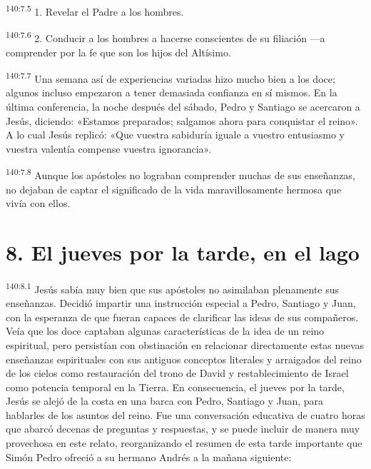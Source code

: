 \par 
\textsuperscript{140:7.5} 1. Revelar el Padre a los hombres.

\par 
\textsuperscript{140:7.6} 2. Conducir a los hombres a hacerse conscientes de su filiación ---a comprender por la fe que son los hijos del Altísimo.

\par 
\textsuperscript{140:7.7} Una semana así de experiencias variadas hizo mucho bien a los doce; algunos incluso empezaron a tener demasiada confianza en sí mismos. En la última conferencia, la noche después del sábado, Pedro y Santiago se acercaron a Jesús, diciendo: «Estamos preparados; salgamos ahora para conquistar el reino». A lo cual Jesús replicó: «Que vuestra sabiduría iguale a vuestro entusiasmo y vuestra valentía compense vuestra ignorancia».

\par 
\textsuperscript{140:7.8} Aunque los apóstoles no lograban comprender muchas de sus enseñanzas, no dejaban de captar el significado de la vida maravillosamente hermosa que vivía con ellos.

\section*{8. El jueves por la tarde, en el lago}
\par 
\textsuperscript{140:8.1} Jesús sabía muy bien que sus apóstoles no asimilaban plenamente sus enseñanzas. Decidió impartir una instrucción especial a Pedro, Santiago y Juan, con la esperanza de que fueran capaces de clarificar las ideas de sus compañeros. Veía que los doce captaban algunas características de la idea de un reino espiritual, pero persistían con obstinación en relacionar directamente estas nuevas enseñanzas espirituales con sus antiguos conceptos literales y arraigados del reino de los cielos como restauración del trono de David y restablecimiento de Israel como potencia temporal en la Tierra. En consecuencia, el jueves por la tarde, Jesús se alejó de la costa en una barca con Pedro, Santiago y Juan, para hablarles de los asuntos del reino. Fue una conversación educativa de cuatro horas que abarcó decenas de preguntas y respuestas, y se puede incluir de manera muy provechosa en este relato, reorganizando el resumen de esta tarde importante que Simón Pedro ofreció a su hermano Andrés a la mañana siguiente:

